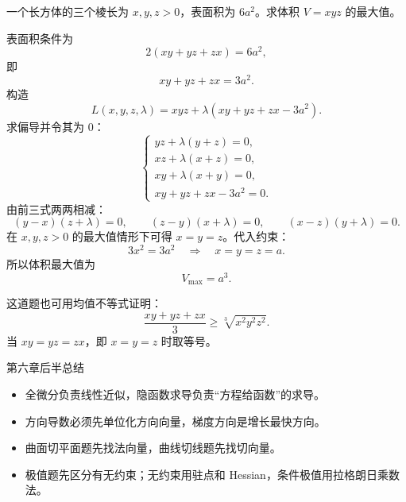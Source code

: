 \begin{problem}
一个长方体的三个棱长为 $x,y,z>0$，表面积为 $6a^2$。求体积 $V=xyz$ 的最大值。
\end{problem}
\begin{solution}
表面积条件为
\[
  2(xy+yz+zx)=6a^2,
\]
即
\[
  xy+yz+zx=3a^2.
\]
构造
\[
  L(x,y,z,\lambda)=xyz+\lambda(xy+yz+zx-3a^2).
\]
求偏导并令其为 $0$：
\[
\begin{cases}
yz+\lambda(y+z)=0,\\
xz+\lambda(x+z)=0,\\
xy+\lambda(x+y)=0,\\
xy+yz+zx-3a^2=0.
\end{cases}
\]
由前三式两两相减：
\[
  (y-x)(z+\lambda)=0,\qquad
  (z-y)(x+\lambda)=0,\qquad
  (x-z)(y+\lambda)=0.
\]
在 $x,y,z>0$ 的最大值情形下可得 $x=y=z$。代入约束：
\[
  3x^2=3a^2\quad\Rightarrow\quad x=y=z=a.
\]
所以体积最大值为
\[
  V_{\max}=a^3.
\]
\end{solution}
\begin{note}
这道题也可用均值不等式证明：
\[
  \frac{xy+yz+zx}{3}\ge \sqrt[3]{x^2y^2z^2}.
\]
当 $xy=yz=zx$，即 $x=y=z$ 时取等号。
\end{note}
\begin{warningbox}{第六章后半总结}
\begin{itemize}
  \item 全微分负责线性近似，隐函数求导负责“方程给函数”的求导。
  \item 方向导数必须先单位化方向向量，梯度方向是增长最快方向。
  \item 曲面切平面题先找法向量，曲线切线题先找切向量。
  \item 极值题先区分有无约束；无约束用驻点和 Hessian，条件极值用拉格朗日乘数法。
\end{itemize}
\end{warningbox}
